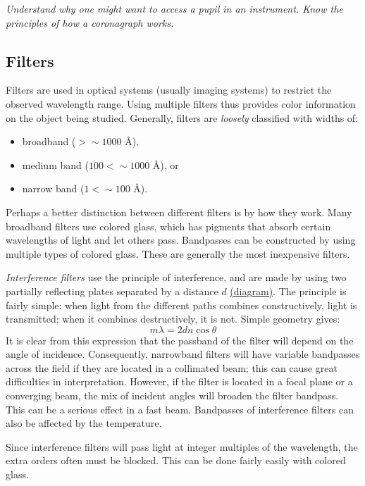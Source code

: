 \documentclass[12pt]{article}
\newcommand{\test}[1]{%
    \begin{center}
        {\parbox{0.9\textwidth}{\textit{\small#1}}}
    \end{center}}
\begin{document}
\test{Understand why one might want to access a pupil in an instrument.
Know the principles of how a coronagraph works.}

\subsection{Filters}
Filters are used in optical systems (usually imaging systems) to restrict the
observed wavelength range. Using multiple filters thus provides color
information on the object being studied. Generally, filters are \emph{loosely}
classified with widths of:
\begin{itemize}
    \item broadband ($ > \sim 1000$ \AA{}),
    \item medium band ($100 < \sim 1000$ \AA{}), or
    \item narrow band ($1 < \sim 100$ \AA{}).
\end{itemize}

Perhaps a better distinction between different filters is by how they work.
Many broadband filters use colored glass, which has pigments that absorb
certain wavelengths of light and let others pass. Bandpasses can be constructed
by using multiple types of colored glass. These are generally the most
inexpensive filters.

\textit{Interference filters} use the principle of interference, and are made
by using two partially reflecting plates separated by a distance $d$
\href{http://astronomy.nmsu.edu/holtz/a535/html/diagrams/a535/intfilt.htm}
{(diagram)}. The principle is fairly simple: when light from the different
paths combines constructively, light is transmitted; when it combines
destructively, it is not. Simple geometry gives:
\[
    m\lambda = 2dn\cos\theta
    \]
It is clear from this expression that the passband of the filter will depend on
the angle of incidence. Consequently, narrowband filters will have variable
bandpasses across the field if they are located in a collimated beam; this can
cause great difficulties in interpretation. However, if the filter is located
in a focal plane or a converging beam, the mix of incident angles will broaden
the filter bandpass. This can be a serious effect in a fast beam. Bandpasses of
interference filters can also be affected by the temperature.

Since interference filters will pass light at integer multiples of the
wavelength, the extra orders often must be blocked. This can be done fairly
easily with colored glass.
\end{document}
